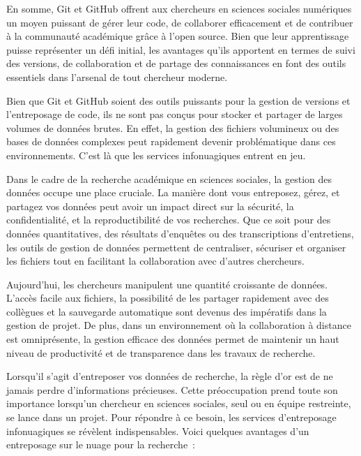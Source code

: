 \documentclass[
  letterpaper,
  DIV=11,
  numbers=noendperiod]{scrreprt}
\begin{document}
En somme, Git et GitHub offrent aux chercheurs en sciences sociales
numériques un moyen puissant de gérer leur code, de collaborer
efficacement et de contribuer à la communauté académique grâce à l'open
source. Bien que leur apprentissage puisse représenter un défi initial,
les avantages qu'ils apportent en termes de suivi des versions, de
collaboration et de partage des connaissances en font des outils
essentiels dans l'arsenal de tout chercheur moderne.

Bien que Git et GitHub soient des outils puissants pour la gestion de
versions et l'entreposage de code, ils ne sont pas conçus pour stocker
et partager de larges volumes de données brutes. En effet, la gestion
des fichiers volumineux ou des bases de données complexes peut
rapidement devenir problématique dans ces environnements. C'est là que
les services infonuagiques entrent en jeu.

Dans le cadre de la recherche académique en sciences sociales, la
gestion des données occupe une place cruciale. La manière dont vous
entreposez, gérez, et partagez vos données peut avoir un impact direct
sur la sécurité, la confidentialité, et la reproductibilité de vos
recherches. Que ce soit pour des données quantitatives, des résultats
d'enquêtes ou des transcriptions d'entretiens, les outils de gestion de
données permettent de centraliser, sécuriser et organiser les fichiers
tout en facilitant la collaboration avec d'autres chercheurs.

Aujourd'hui, les chercheurs manipulent une quantité croissante de
données. L'accès facile aux fichiers, la possibilité de les partager
rapidement avec des collègues et la sauvegarde automatique sont devenus
des impératifs dans la gestion de projet. De plus, dans un environnement
où la collaboration à distance est omniprésente, la gestion efficace des
données permet de maintenir un haut niveau de productivité et de
transparence dans les travaux de recherche.

Lorsqu'il s'agit d'entreposer vos données de recherche, la règle d'or
est de ne jamais perdre d'informations précieuses. Cette préoccupation
prend toute son importance lorsqu'un chercheur en sciences sociales,
seul ou en équipe restreinte, se lance dans un projet. Pour répondre à
ce besoin, les services d'entreposage infonuagiques se révèlent
indispensables. Voici quelques avantages d'un entreposage sur le nuage
pour la recherche~:
\end{document}
